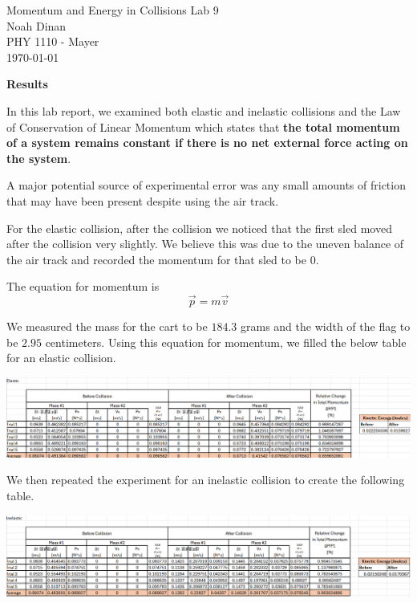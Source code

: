 \documentclass[12pt]{article}
\begin{document}
\begin{center}
\vspace*{\fill}
Momentum and Energy in Collisions Lab 9 \\ Noah Dinan \\ PHY 1110 - Mayer \\ \today \\
\vspace*{\fill}
\end{center}

\newpage
{} %
\setlength{\parindent}{0in}

\textbf{Results}

In this lab report, we examined both elastic and inelastic collisions and the
Law of Conservation of Linear Momentum which states that \textbf{the total momentum
of a system remains constant if there is no net external force acting on the system}.

A major potential source of experimental error was any small amounts of friction that may
have been present despite using the air track.

For the elastic collision, after the collision we noticed that the first sled moved after the collision
very slightly. We believe this was due to the uneven balance of the air track and recorded the momentum for that
sled to be 0.


The equation for momentum is
\[ \vec{p} = m\vec{v} \]


We measured the mass for the cart to be $184.3$ grams and the width of the flag to be $2.95$ centimeters.
Using this equation for momentum, we filled the below table for an elastic collision.

\begin{center}
   \includegraphics[scale=0.5]{elastic_1.png}
\end{center}

We then repeated the experiment for an inelastic collision to create the following table.

\begin{center}
   \includegraphics[scale=0.5]{inelastic_1.png}
\end{center}
\end{document}
